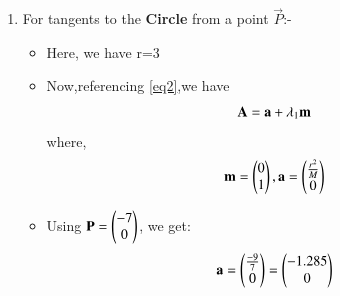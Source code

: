 \documentclass[journal,12pt,twocolumn]{IEEEtran}
\begin{document}
\begin{enumerate}
\begin{proof}
\begin{itemize}
\item Now,using \eqref{eq1} in above equation we get:
\begin{align}
    \implies  \myvec{M&0}\vec{N} &=r^2 
    \\
    \implies   \myvec{1&0}\vec{N} &=\myvec{\frac{r^2}{M}\\0} 
    \\
    \implies \vec{N}&=\myvec{\frac{r^2}{M}\\0} +\lambda\myvec{0\\1}
  \\
    \implies \vec{N}&=\vec{n}+\lambda\vec{m} 
   \end{align}
    \begin{align}
   \text{where, }\vec{n}&=\myvec{\frac{r^2}{M}\\0} \text{and }\vec{m}=\myvec{0\\1}
   \end{align}
\item Also we know,
\begin{align}
\norm{\vec{n}+\lambda\vec{m}}^2&=r^2
\\
(\vec{n}+\lambda \vec{m})^T(\vec{n}+\lambda \vec{m})&=r^2
\end{align}
\begin{align}
\lambda^2&=\frac{r^2-\norm{\vec{n}}^2}{\norm{\vec{m}}^2}
\\
\lambda &= \pm \sqrt{\frac{r^2-\norm{\vec{n}}^2}{\norm{\vec{m}}^2}} 
\end{align}
\end{itemize}
\end{proof}
\item For tangents to the \textbf{Circle} from a point $\vec{P}$:-
\begin{itemize}
\item Here, we have r=3
\item Now,referencing \eqref{eq2},we have
\begin{align}
 \vec{A}=\vec{a}+\lambda\textsubscript{1}\vec{m}   \label{eqa}
\end{align}
where,
\begin{align}
 \vec{m}=\myvec{0\\1},\vec{a}=\myvec{\frac{r^2}{M}\\0}
 \end{align}
 \item Using $\vec{P}=\myvec{-7\\0}$, we get: 
 \begin{align}
 \vec{a}=\myvec{\frac{-9}{7}\\0}=\myvec{-1.285\\0}

\end{align}
\end{itemize}
\end{enumerate}
\end{document}
